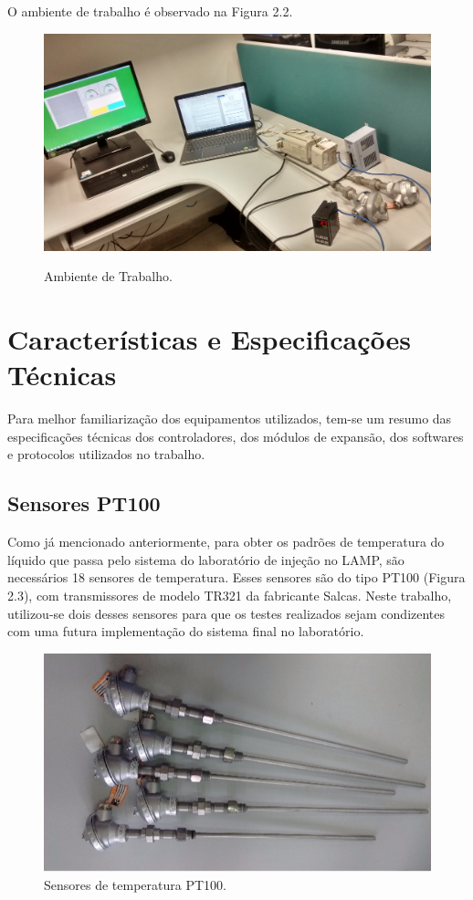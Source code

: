 O ambiente de trabalho é observado na Figura 2.2.%

\begin{figure}[h!]
  \center
  \includegraphics[scale=0.15]{Ambiente.jpg}
  \label{fig:Ambiente}
  \caption{Ambiente de Trabalho.}
\end{figure}


\section{Características e Especificações Técnicas}

Para melhor familiarização dos equipamentos utilizados, tem-se um resumo das especificações técnicas dos controladores, dos módulos de expansão, dos softwares e protocolos utilizados no trabalho.

\subsection{Sensores PT100}

Como já mencionado anteriormente, para obter os padrões de temperatura do líquido que passa pelo sistema do laboratório de injeção no LAMP, são necessários 18 sensores de temperatura. Esses sensores são do tipo PT100 (Figura 2.3), com transmissores de modelo TR321 da fabricante Salcas. Neste trabalho, utilizou-se dois desses sensores para que os testes realizados sejam condizentes com uma futura implementação do sistema final no laboratório.

\begin{figure}[h!]
  \center
  \label{fig:Pt100}
  \includegraphics[scale=0.8]{Pt100.png}
  \caption{Sensores de temperatura PT100.}
\end{figure}

